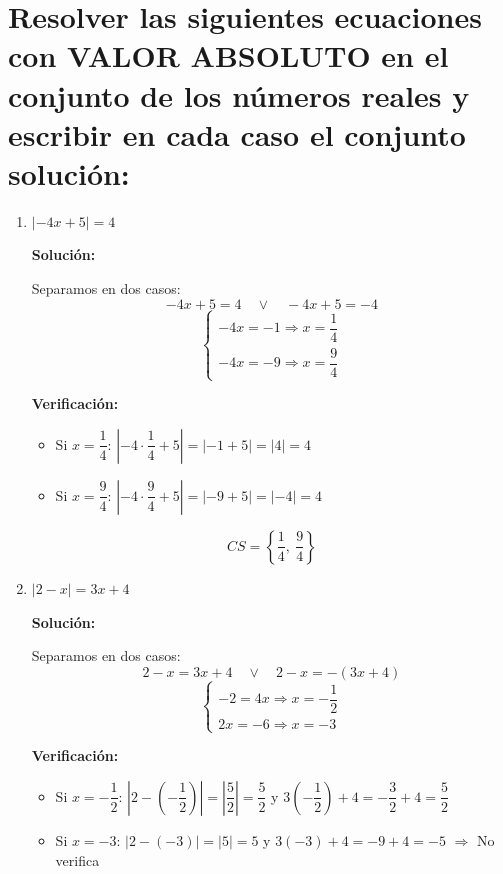 \documentclass[12pt]{article}
\newcommand{\solucion}{%
    \vspace{0.8em}%
    \textbf{Solución:}%
}
\begin{document}
\section[Ecuaciones con valor absoluto]{Resolver las siguientes ecuaciones con VALOR ABSOLUTO en el conjunto de los números reales y escribir en cada caso el conjunto solución:}

\begin{enumerate}[label=\alph*.-]

    \item $|-4x + 5| = 4$

    \solucion

    Separamos en dos casos:
    \[
    -4x + 5 = 4 \quad \lor \quad -4x + 5 = -4
    \]
    \[
    \begin{cases}
    -4x = -1 \Rightarrow x = \dfrac{1}{4} \\[0.5em]
    -4x = -9 \Rightarrow x = \dfrac{9}{4}
    \end{cases}
    \]

    \textbf{Verificación:}
    \begin{itemize}
        \item Si $x = \dfrac{1}{4}$: $\left|-4 \cdot \dfrac{1}{4} + 5\right| = |-1 + 5| = |4| = 4$ \checkmark
        \item Si $x = \dfrac{9}{4}$: $\left|-4 \cdot \dfrac{9}{4} + 5\right| = |-9 + 5| = |-4| = 4$ \checkmark
    \end{itemize}

    \[
    \boxed{CS = \left\{\dfrac{1}{4},\ \dfrac{9}{4}\right\}}
    \]

    \item $|2 - x| = 3x + 4$

    \solucion

    Separamos en dos casos:
    \[
    2 - x = 3x + 4 \quad \lor \quad 2 - x = -(3x + 4)
    \]
    \[
    \begin{cases}
    -2 = 4x \Rightarrow x = -\dfrac{1}{2} \\[0.5em]
    2x = -6 \Rightarrow x = -3
    \end{cases}
    \]

    \textbf{Verificación:}
    \begin{itemize}
        \item Si $x = -\dfrac{1}{2}$: $\left|2 - \left(-\dfrac{1}{2}\right)\right| = \left|\dfrac{5}{2}\right| = \dfrac{5}{2}$ \quad y \quad $3\left(-\dfrac{1}{2}\right) + 4 = -\dfrac{3}{2} + 4 = \dfrac{5}{2}$ \checkmark
        \item Si $x = -3$: $|2 - (-3)| = |5| = 5$ \quad y \quad $3(-3) + 4 = -9 + 4 = -5$ \quad $\Rightarrow$ No verifica
    \end{itemize}


\end{enumerate}
\end{document}

